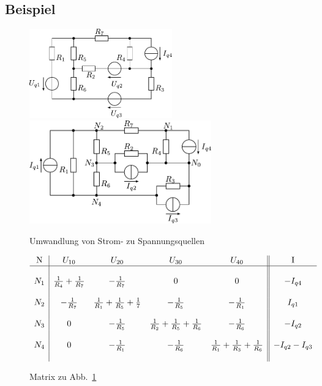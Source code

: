 \newpage
\subsection{Beispiel}

\begin{figure}[h!]
\centering
\includegraphics[width=0.55\textwidth]{knotpot_sch.pdf}
\includegraphics[width=0.7\textwidth]{knotpot_sch_2.pdf}
\label{sch:knotpot_2}
\caption{Umwandlung von Strom- zu Spannungsquellen}
\end{figure}

\begin{figure}[h!]
\footnotesize
\[ 	\begin{array}{c|cccc||c}
	\text{N} & U_{10}						& U_{20}										& U_{30} 											& U_{40} 											& \text{I} \\
	\hline &&&&& \\
	N_1	& \frac{1}{R_4} + \frac{1}{R_7}		& -\frac{1}{R_7} 								& 0 												& 0 												& -I_{q4} 			\\
	&&&&& \\
	N_2	& -\frac{1}{R_7} 					& \frac{1}{R_1} + \frac{1}{R_5} + \frac{1}{7} 	& -\frac{1}{R_5} 									& -\frac{1}{R_1} 									& I_{q1} 			\\ 
	&&&&& \\
	N_3	& 0 								& -\frac{1}{R_5} 								& \frac{1}{R_2} + \frac{1}{R_5} + \frac{1}{R_6} 	& -\frac{1}{R_6} 									& -I_{q2} 			\\ 
	&&&&& \\
	N_4 & 0 								& -\frac{1}{R_1} 								& -\frac{1}{R_6} 									& \frac{1}{R_1} + \frac{1}{R_3} + \frac{1}{R_6} 	& -I_{q2} -I_{q3} 	\\ 
	&&&&& \\
	\end{array}
\]
\normalsize
\caption{Matrix zu Abb.~\ref{sch:knotpot_2}}
\end{figure}

\newpage
